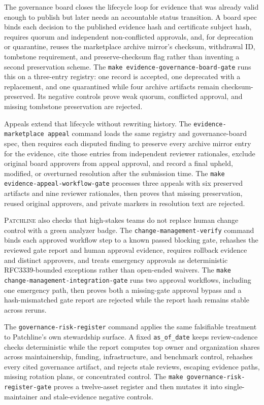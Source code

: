 \documentclass[11pt]{article}
\newcommand{\tool}{\textsc{Patchline}}
\newcommand{\code}[1]{\texttt{#1}}
\newcommand{\gate}[1]{\texttt{make #1}}
\begin{document}
The governance board closes the lifecycle loop for evidence that was already valid enough to publish
but later needs an accountable status transition. A board spec binds each decision to the published
evidence hash and certificate subject hash, requires quorum and independent non-conflicted approvals,
and, for deprecation or quarantine, reuses the marketplace archive mirror's checksum, withdrawal ID,
tombstone requirement, and preserve-checksum flag rather than inventing a second preservation scheme.
The \gate{evidence-governance-board-gate} runs this on a three-entry registry: one record is accepted,
one deprecated with a replacement, and one quarantined while four archive artifacts remain
checksum-preserved. Its negative controls prove weak quorum, conflicted approval, and missing tombstone
preservation are rejected.

Appeals extend that lifecycle without rewriting history. The \code{evidence-marketplace appeal} command
loads the same registry and governance-board spec, then requires each disputed finding to preserve every
archive mirror entry for the evidence, cite those entries from independent reviewer rationales, exclude
original board approvers from appeal approval, and record a final upheld, modified, or overturned
resolution after the submission time. The \gate{evidence-appeal-workflow-gate} processes three appeals
with six preserved artifacts and nine reviewer rationales, then proves that missing preservation, reused
original approvers, and private markers in resolution text are rejected.

\tool{} also checks that high-stakes teams do not replace human change control with a green analyzer
badge. The \code{change-management-verify} command binds each approved workflow step to a known passed
blocking gate, rehashes the reviewed gate report and human approval evidence, requires rollback evidence
and distinct approvers, and treats emergency approvals as deterministic RFC3339-bounded exceptions rather
than open-ended waivers. The \gate{change-management-integration-gate} runs two approval workflows,
including one emergency path, then proves both a missing-gate approval bypass and a hash-mismatched gate
report are rejected while the report hash remains stable across reruns.

The \code{governance-risk-register} command applies the same falsifiable treatment to Patchline's own
stewardship surface. A fixed \code{as\_of\_date} keeps review-cadence checks deterministic while the
report computes top owner and organization shares across maintainership, funding, infrastructure, and
benchmark control, rehashes every cited governance artifact, and rejects stale reviews, escaping
evidence paths, missing rotation plans, or concentrated control. The
\gate{governance-risk-register-gate} proves a twelve-asset register and then mutates it into
single-maintainer and stale-evidence negative controls.
\end{document}
